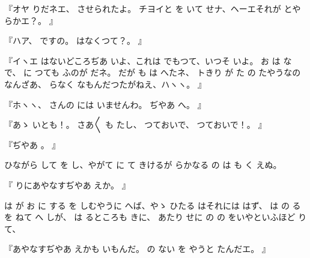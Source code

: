 『オヤ
りだネエ、
させられたよ。
チヨイと
を
いて
せナ、ヘーエそれが
とやらかエ？。
』

『ハア、
ですの。
はなくつて？。
』

『イヽエ
はないどころぢあ
いよ、これは
でもつて、いつそ
いよ。
お
は
な
で、
に
つても
ふのが
だネ。
だが
も
は
へたネ、
トきり
が
た
の
たやうなのなんざあ、
らなく
なもんだつたがねえ、ハヽヽ。
』

『ホヽヽ、
さんの
には
いませんわ。
ぢやあ
へ。
』

『あゝ
いとも！。
さあ〳〵
も
たし、
つておいで、
つておいで！。
』

『ぢやあ
。
』

ひながら
して
を
し、やがて
に
て
きけるが
らかなる
の
は
も
く
えぬ。

『
りにあやなすぢやあ
えか。
』

は
が
お
に
する
を
しむやうに
へば、やゝ
ひたる
はそれには
はず、
は
の
る
を
ねて
へ
しが、
は
るところも
きに、
あたり
せに
の
の
をいやといふほど
りて、

『あやなすぢやあ
えかも
いもんだ。
の
ない
を
やうと
たんだエ。
』

